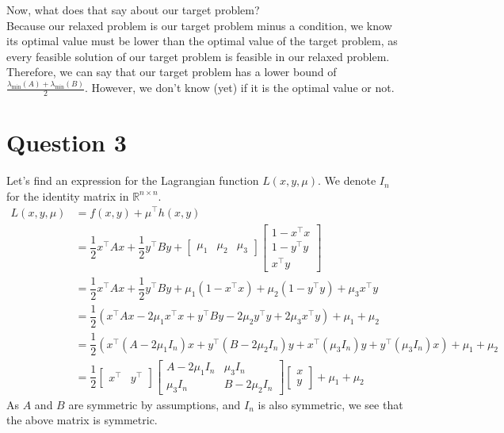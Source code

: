 \documentclass{article}
\newcommand{\R}{\mathbb{R}}
\newcommand{\tp}{^\top}
\newcommand{\fxy}{\dfrac{1}{2}x\tp A x + \dfrac{1}{2} y\tp B y}
\newcommand{\hxy}{\begin{bmatrix}
1-x\tp x\\
1-y\tp y\\
x\tp y
\end{bmatrix}}
\begin{document}
Now, what does that say about our target problem?\\
Because our relaxed problem is our target problem minus a condition, we know its optimal value must be lower than the optimal value of the target problem, as every feasible solution of our target problem is feasible in our relaxed problem. Therefore, we can say that our target problem has a lower bound of $\frac{\lambda_{\min} (A)+\lambda_{\min} (B)}{2}$. However, we don't know (yet) if it is the optimal value or not.

\section*{Question 3}
Let's find an expression for the Lagrangian function $L(x,y,\mu)$. We denote $I_n$ for the identity matrix in $\R^{n\times n}$.
\begin{align*}
L(x,y,\mu) &= f(x,y)+\mu\tp h(x,y) \\
&=\fxy  + \begin{bmatrix} \mu_1 &\mu_2 & \mu_3 \end{bmatrix} \hxy \\
&=\fxy + \mu_1(1-x\tp x) +\mu_2(1-y\tp y) + \mu_3 x\tp y \\
&= \dfrac{1}{2}\left(x\tp A x - 2\mu_1 x\tp x +  y\tp B y -2\mu_2 y\tp y + 2\mu_3 x\tp y\right) + \mu_1+\mu_2 \\
&= \dfrac{1}{2} \left(x\tp  \left( A - 2\mu_1 I_n \right) x +  y\tp \left( B -2\mu_2 I_n \right) y   + x\tp  \left( \mu_3 I_n \right) y+ y\tp \left( \mu_3 I_n \right) x \right) + \mu_1+\mu_2 \\
&= \dfrac{1}{2} \begin{bmatrix} x\tp & y\tp\end{bmatrix}
\begin{bmatrix} A-2\mu_1 I_n & \mu_3 I_n \\
\mu_3 I_n & B-2\mu_2 I_n \end{bmatrix}
\begin{bmatrix} x \\ y \end{bmatrix} +\mu_1+\mu_2 
\end{align*}
As $A$ and $B$ are symmetric by assumptions, and $I_n$ is also symmetric, we see that the above matrix is symmetric.
\end{document}
